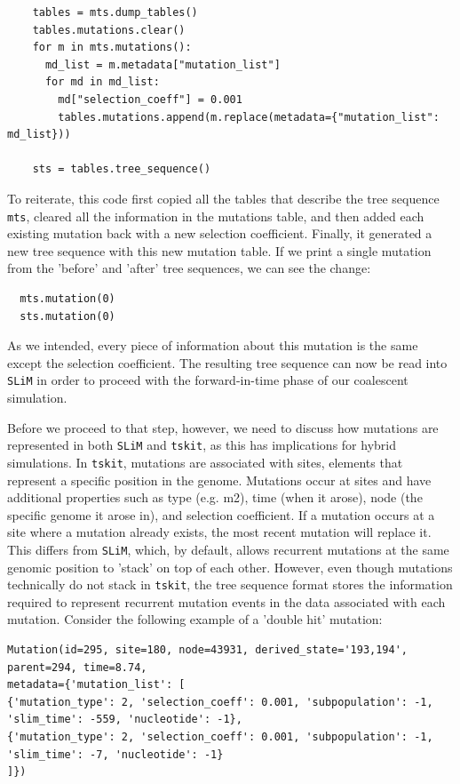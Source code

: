 \documentclass[12pt]{article}
\newcommand{\tskit}[0]{\texttt{tskit}\xspace}
\newcommand{\slim}[0]{\texttt{SLiM}\xspace}
\begin{document}
  \begin{verbatim}
    tables = mts.dump_tables()
    tables.mutations.clear()
    for m in mts.mutations():
      md_list = m.metadata["mutation_list"]
      for md in md_list:
        md["selection_coeff"] = 0.001
        tables.mutations.append(m.replace(metadata={"mutation_list": md_list}))

    sts = tables.tree_sequence()
  \end{verbatim}

To reiterate, this code first copied all the tables that describe the tree sequence \verb|mts|, cleared all the
information in the mutations table, and then added each existing mutation back with a new selection
coefficient. Finally, it generated a new tree sequence with this new mutation table. If we print a single
mutation from the 'before' and 'after' tree sequences, we can see the change:

  \begin{verbatim}
  mts.mutation(0)
  sts.mutation(0)
  \end{verbatim}

As we intended, every piece of information about this mutation is the same except the selection coefficient. The resulting tree
sequence can now be read into \slim in order to proceed with the forward-in-time phase of our coalescent simulation.

Before we proceed to that step, however, we need to discuss how mutations are represented in both \slim and \tskit, as this has
implications for hybrid simulations. In \tskit, mutations are associated with sites, elements that represent a specific
position in the genome. Mutations occur at sites and have additional properties such as type (e.g. m2), time (when it arose),
node (the specific genome it arose in), and selection coefficient. If a mutation occurs at a site where a mutation already exists,
the most recent mutation will replace it. This differs from \slim, which, by default, allows recurrent mutations at the same genomic
position to 'stack' on top of each other. However, even though mutations technically do not stack in \tskit, the tree sequence
format stores the information required to represent recurrent mutation events in the data associated with each mutation.
Consider the following example of a 'double hit' mutation:

\begin{verbatim}
Mutation(id=295, site=180, node=43931, derived_state='193,194',
parent=294, time=8.74,
metadata={'mutation_list': [
{'mutation_type': 2, 'selection_coeff': 0.001, 'subpopulation': -1, 'slim_time': -559, 'nucleotide': -1},
{'mutation_type': 2, 'selection_coeff': 0.001, 'subpopulation': -1, 'slim_time': -7, 'nucleotide': -1}
]})
\end{verbatim}
\end{document}
